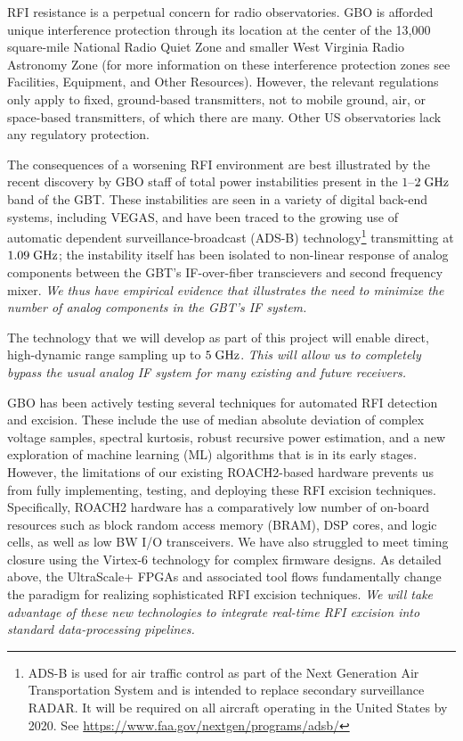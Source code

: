 \documentclass[10pt]{myNSF}
\begin{document}
 RFI resistance is a perpetual concern for
radio observatories.  GBO is afforded unique interference protection
through its location at the center of the 13,000 square-mile National
Radio Quiet Zone and smaller West Virginia Radio Astronomy Zone (for
more information on these interference protection zones see
Facilities, Equipment, and Other Resources).  However, the relevant
regulations only apply to fixed, ground-based transmitters, not to
mobile ground, air, or space-based transmitters, of which there are
many.  Other US observatories lack any regulatory protection.

The consequences of a worsening RFI environment are best illustrated
by the recent discovery by GBO staff of total power instabilities
present in the $1$--$2\; \textrm{GHz}$ band of the GBT.  These instabilities
are seen in a variety of digital back-end systems, including VEGAS,
and have been traced to the growing use of automatic dependent
surveillance-broadcast (ADS-B) technology\footnote{ADS-B is used for
  air traffic control as part of the Next Generation Air
  Transportation System and is intended to replace secondary
  surveillance RADAR.  It will be required on all aircraft operating
  in the United States by 2020.  See
  \url{https://www.faa.gov/nextgen/programs/adsb/}} transmitting at
$1.09\; \textrm{GHz}$; the instability itself has been isolated to non-linear
response of analog components between the GBT's IF-over-fiber
transcievers and second frequency mixer.  \emph{We thus have empirical
  evidence that illustrates the need to minimize the number of analog
  components in the GBT's IF system.}

The technology that we will develop as part of this project will
enable direct, high-dynamic range sampling up to $5\; \textrm{GHz}$.
\emph{This will allow us to completely bypass the usual analog IF
  system for many existing and future receivers.}

 GBO has been actively testing several
techniques for automated RFI detection and excision.  These include
the use of median absolute deviation of complex voltage samples,
spectral kurtosis, robust recursive power estimation, and a new
exploration of machine learning (ML) algorithms that is in its early
stages.  However, the limitations of our existing ROACH2-based
hardware prevents us from fully implementing, testing, and deploying
these RFI excision techniques.  Specifically, ROACH2 hardware has a
comparatively low number of on-board resources such as block random
access memory (BRAM), DSP cores, and logic cells, as well as low BW
I/O transceivers.  We have also struggled to meet timing closure using
the Virtex-6 technology for complex firmware designs. As detailed
above, the UltraScale+ FPGAs and associated tool flows fundamentally
change the paradigm for realizing sophisticated RFI excision
techniques.  \emph{We will take advantage of these new technologies to
  integrate real-time RFI excision into standard data-processing
  pipelines.}
\end{document}
